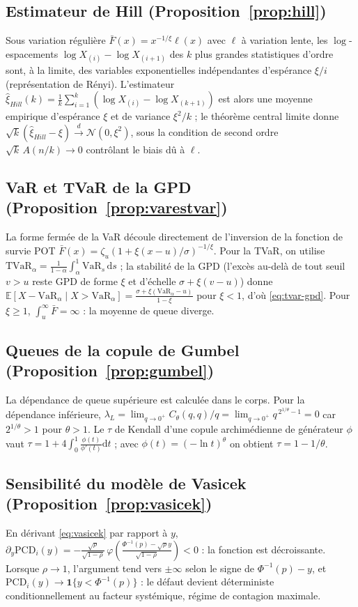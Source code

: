 \documentclass[11pt,a4paper]{article}
\theoremstyle{navystyle}
\theoremstyle{navydef}
\newcommand{\E}{\mathbb{E}}
\newcommand{\VaR}{\mathrm{VaR}}
\newcommand{\TVaR}{\mathrm{TVaR}}
\newcommand{\dd}{\mathrm{d}}
\newcommand{\indic}{\mathbf{1}}
\begin{document}
\subsection{Estimateur de Hill (Proposition~\ref{prop:hill})}
\label{ann:hill}
Sous variation régulière $\bar F(x)=x^{-1/\xi}\ell(x)$ avec $\ell$ à variation lente, les $\log$-espacements $\log X_{(i)}-\log X_{(i+1)}$ des $k$ plus grandes statistiques d'ordre sont, à la limite, des variables exponentielles indépendantes d'espérance $\xi/i$ (représentation de Rényi). L'estimateur $\hat\xi_{Hill}(k)=\frac1k\sum_{i=1}^k(\log X_{(i)}-\log X_{(k+1)})$ est alors une moyenne empirique d'espérance $\xi$ et de variance $\xi^2/k$ ; le théorème central limite donne $\sqrt k(\hat\xi_{Hill}-\xi)\xrightarrow{d}\mathcal N(0,\xi^2)$, sous la condition de second ordre $\sqrt k\,A(n/k)\to0$ contrôlant le biais dû à $\ell$.

\subsection{VaR et TVaR de la GPD (Proposition~\ref{prop:varestvar})}
\label{ann:varestvar}
La forme fermée de la VaR découle directement de l'inversion de la fonction de survie POT $\bar F(x)=\zeta_u(1+\xi(x-u)/\sigma)^{-1/\xi}$. Pour la TVaR, on utilise $\TVaR_\alpha=\frac{1}{1-\alpha}\int_\alpha^1\VaR_s\,\dd s$ ; la stabilité de la GPD (l'excès au-delà de tout seuil $v>u$ reste GPD de forme $\xi$ et d'échelle $\sigma+\xi(v-u)$) donne $\E[X-\VaR_\alpha\mid X>\VaR_\alpha]=\frac{\sigma+\xi(\VaR_\alpha-u)}{1-\xi}$ pour $\xi<1$, d'où \eqref{eq:tvar-gpd}. Pour $\xi\ge1$, $\int_u^\infty\bar F=\infty$ : la moyenne de queue diverge.

\subsection{Queues de la copule de Gumbel (Proposition~\ref{prop:gumbel})}
\label{ann:gumbel}
La dépendance de queue supérieure est calculée dans le corps. Pour la dépendance inférieure, $\lambda_L=\lim_{q\to0^+}C_\theta(q,q)/q=\lim_{q\to0^+}q^{\,2^{1/\theta}-1}=0$ car $2^{1/\theta}>1$ pour $\theta>1$. Le $\tau$ de Kendall d'une copule archimédienne de générateur $\phi$ vaut $\tau=1+4\int_0^1\frac{\phi(t)}{\phi'(t)}\dd t$ ; avec $\phi(t)=(-\ln t)^\theta$ on obtient $\tau=1-1/\theta$.

\subsection{Sensibilité du modèle de Vasicek (Proposition~\ref{prop:vasicek})}
\label{ann:vasicek}
En dérivant \eqref{eq:vasicek} par rapport à $y$, $\partial_y\mathrm{PCD}_i(y)=-\frac{\sqrt\rho}{\sqrt{1-\rho}}\,\varphi\!\left(\frac{\Phi^{-1}(p)-\sqrt\rho y}{\sqrt{1-\rho}}\right)<0$ : la fonction est décroissante. Lorsque $\rho\to1$, l'argument tend vers $\pm\infty$ selon le signe de $\Phi^{-1}(p)-y$, et $\mathrm{PCD}_i(y)\to\indic\{y<\Phi^{-1}(p)\}$ : le défaut devient déterministe conditionnellement au facteur systémique, régime de contagion maximale.
\end{document}
